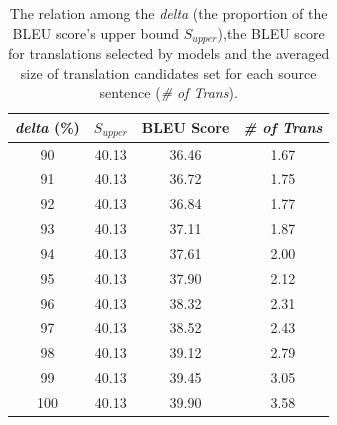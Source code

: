 \documentclass[11pt]{article}
\begin{document}
 \begin{table}[h]
\begin{tabular}{|c|c|c|c|}
\hline

\textit{delta} (\%) & $S_{upper}$ & BLEU Score & \textit{\# of Trans} \\ \hline
90         & 40.13       & 36.46      & 1.67       \\ \hline
91         & 40.13       & 36.72      & 1.75       \\ \hline
92         & 40.13       & 36.84      & 1.77       \\ \hline
93         & 40.13       & 37.11      & 1.87       \\ \hline
94         & 40.13       & 37.61      & 2.00       \\ \hline
95         & 40.13       & 37.90      & 2.12       \\ \hline
96         & 40.13       & 38.32      & 2.31       \\ \hline
97         & 40.13       & 38.52      & 2.43       \\ \hline
98         & 40.13       & 39.12      & 2.79       \\ \hline
99         & 40.13       & 39.45      & 3.05       \\ \hline
100        & 40.13       & 39.90      & 3.58       \\ \hline
\end{tabular}
\caption{The relation among the \textit{delta} (the proportion of the BLEU score's upper bound $S_{upper}$),the BLEU score for translations selected by models and the averaged size of translation candidates set for each source sentence (\textit{\# of Trans}).  }
    \label{orderanother}
\end{table}
\end{document}
